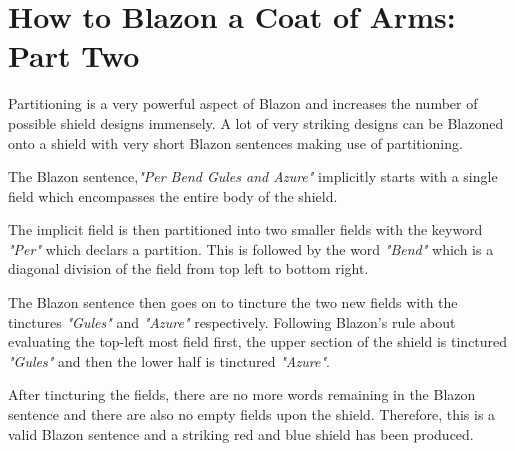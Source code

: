 \section{How to Blazon a Coat of Arms: Part Two}
Partitioning is a very powerful aspect of Blazon and increases the number of possible shield designs immensely.  A lot of very striking designs can be Blazoned onto a shield with very short Blazon sentences making use of partitioning.  


The Blazon sentence,\emph{"Per Bend Gules and Azure"} implicitly starts with a single field which encompasses the entire body of the shield. 


The implicit  field  is then partitioned into two smaller fields with the keyword \emph{"Per"} which declars a partition.  This is followed by the word \emph{"Bend"} which is a diagonal division of the field from top left to bottom right.

The Blazon sentence then goes on to tincture the two new fields with the tinctures \emph{"Gules"} and \emph{"Azure"} respectively.  Following Blazon's rule about evaluating the top-left most field first, the upper section of the shield is tinctured \emph{"Gules"} and then the lower half is tinctured \emph{"Azure"}.

After tincturing the fields, there are no more words remaining in the Blazon sentence and there are also no empty fields upon the shield. Therefore, this is a valid Blazon sentence and a striking red and blue shield has been produced. 


